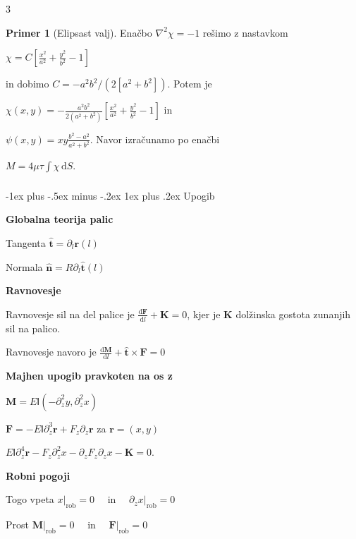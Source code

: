 \documentclass[10pt,landscape]{article}
\makeatletter
\renewcommand{\subsubsection}{\@startsection{subsubsection}{3}{0mm}%
	{-1ex plus -.5ex minus -.2ex}%
	{1ex plus .2ex}%
	{\normalfont\small\bfseries}}
\theoremstyle{definition}
\newtheorem*{primer}{Primer}
\makeatother
\begin{document}
\begin{multicols}{3}
  \begin{primer}[Elipsast valj]
    Enačbo \( \nabla ^2 \chi = -1 \) rešimo z nastavkom

    \( \chi = C \left[ \frac{x ^2}{a ^2} + \frac{y ^2}{b ^2} - 1 \right] \)

    in dobimo \( C = - a ^2 b ^2 / \left( 2 \left[ a ^2 + b ^2 \right] \right) \). Potem je

    \( \chi (x, y) = - \frac{a ^2 b ^2}{2 (a ^2 + b ^2)} \left[ \frac{x ^2}{a ^2} + \frac{y ^2}{b ^2} - 1 \right] \) in

    \( \psi(x, y) = xy \frac{b ^2 - a ^2}{a ^2 + b ^2} \). Navor izračunamo po enačbi

    \( M = 4 \mu \tau \int\limits_{}^{} \chi \, \mathrm{d} S \).
  \end{primer}
  
  \subsubsection{Upogib}

  \textbf{Globalna teorija palic}

  Tangenta \( \hat{\mathbf{t}} = \partial_l \mathbf{r} (l) \)

  Normala \( \hat{\mathbf{n}} = R \partial_l \hat{\mathbf{t}} (l) \)

  \textbf{Ravnovesje}

  Ravnovesje sil na del palice je \( \frac{\mathrm{d} \mathbf{F}}{\mathrm{d} l} + \mathbf{K} = 0 \), kjer je \( \mathbf{K} \) dolžinska gostota zunanjih sil na palico.

  Ravnovesje navoro je \( \frac{\mathrm{d} \mathbf{M}}{\mathrm{d} l} + \hat{\mathbf{t}} \times \mathbf{F} = 0 \)

  \textbf{Majhen upogib pravkoten na os z}

  \( \mathbf{M} = E \mathsf{I} \left( - \partial_z ^2 y, \partial_z ^2 x \right) \)

  \( \mathbf{F} = - E \mathsf{I} \partial_z ^3 \mathbf{r} + F_z \partial_z \mathbf{r} \) za \( \mathbf{r} = (x, y) \)

  \( E \mathsf{I} \partial_z ^4 \mathbf{r} - F_z \partial_z ^2 x - \partial_z F_z \partial_z x - \mathbf{K} = 0 \).
    
  \textbf{Robni pogoji}

  Togo vpeta \( \left. x \right|_{\text{rob}} = 0 \quad \text{ in } \quad  \left. \partial_z x \right|_{\text{rob}} = 0 \)

  Prost \( \left. \mathbf{M} \right|_{\text{rob}} = 0 \quad \text{ in } \quad  \left. \mathbf{F} \right|_{\text{rob}} = 0 \)


\end{multicols}
\end{document}
